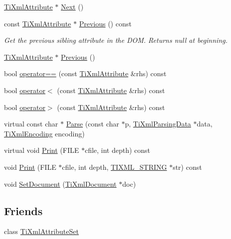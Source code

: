 \begin{DoxyCompactItemize}
\hyperlink{class_ti_xml_attribute}{Ti\+Xml\+Attribute} $\ast$ \hyperlink{class_ti_xml_attribute_a138320aa7793b148ba7e5bd0a0ea4db6}{Next} ()
\item 
const \hyperlink{class_ti_xml_attribute}{Ti\+Xml\+Attribute} $\ast$ \hyperlink{class_ti_xml_attribute_a54a5f8730c7b02b9a41b74e12e27fe86}{Previous} () const 
\begin{DoxyCompactList}\small\item\em Get the previous sibling attribute in the D\+OM. Returns null at beginning. \end{DoxyCompactList}\item 
\hyperlink{class_ti_xml_attribute}{Ti\+Xml\+Attribute} $\ast$ \hyperlink{class_ti_xml_attribute_ae4dabc932cba945ed1e92fec5f121193}{Previous} ()
\item 
bool \hyperlink{class_ti_xml_attribute_ae48c2a65b520d453914ce4e845d607cf}{operator==} (const \hyperlink{class_ti_xml_attribute}{Ti\+Xml\+Attribute} \&rhs) const 
\item 
bool \hyperlink{class_ti_xml_attribute_adb8b6f2cad5948e73e383182e7ce10de}{operator$<$} (const \hyperlink{class_ti_xml_attribute}{Ti\+Xml\+Attribute} \&rhs) const 
\item 
bool \hyperlink{class_ti_xml_attribute_a867562769ef9778c1690cd373246b05b}{operator$>$} (const \hyperlink{class_ti_xml_attribute}{Ti\+Xml\+Attribute} \&rhs) const 
\item 
virtual const char $\ast$ \hyperlink{class_ti_xml_attribute_ad62774421b814894b995af3b5d231dda}{Parse} (const char $\ast$p, \hyperlink{class_ti_xml_parsing_data}{Ti\+Xml\+Parsing\+Data} $\ast$data, \hyperlink{tinyxml_8h_a88d51847a13ee0f4b4d320d03d2c4d96}{Ti\+Xml\+Encoding} encoding)
\item 
virtual void \hyperlink{class_ti_xml_attribute_acc04956c1d5c4c31fe74f7a7528d109a}{Print} (F\+I\+LE $\ast$cfile, int depth) const 
\item 
void \hyperlink{class_ti_xml_attribute_a19e6b6862a80b188571c47947e88d030}{Print} (F\+I\+LE $\ast$cfile, int depth, \hyperlink{tinyxml_8h_a92bada05fd84d9a0c9a5bbe53de26887}{T\+I\+X\+M\+L\+\_\+\+S\+T\+R\+I\+NG} $\ast$str) const 
\item 
void \hyperlink{class_ti_xml_attribute_ac12a94d4548302afb12f488ba101f7d1}{Set\+Document} (\hyperlink{class_ti_xml_document}{Ti\+Xml\+Document} $\ast$doc)
\end{DoxyCompactItemize}
\subsection*{Friends}
\begin{DoxyCompactItemize}
\item 
class \hyperlink{class_ti_xml_attribute_a35a7b7f89f708527677d5078d41ce0bf}{Ti\+Xml\+Attribute\+Set}
\end{DoxyCompactItemize}
